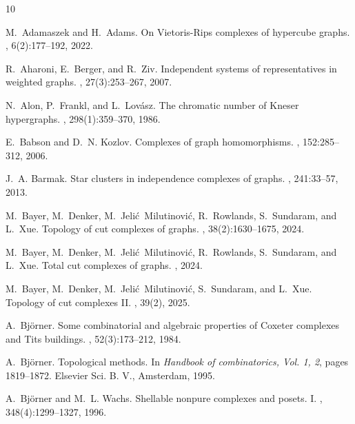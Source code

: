 \documentclass[11pt,reqno,a4paper]{amsart}
\theoremstyle{definition}
\theoremstyle{theorem}
\theoremstyle{remark}
\begin{document}

\begin{thebibliography}{10}
	
	M.~Adamaszek and H.~Adams.
	\newblock On {V}ietoris-{R}ips complexes of hypercube graphs.
	, 6(2):177--192, 2022.
	
	R.~Aharoni, E.~Berger, and R.~Ziv.
	\newblock Independent systems of representatives in weighted graphs.
	, 27(3):253--267, 2007.
	
	N.~Alon, P.~Frankl, and L.~Lov\'asz.
	\newblock The chromatic number of {K}neser hypergraphs.
	, 298(1):359--370, 1986.
	
	E.~Babson and D.~N. Kozlov.
	\newblock Complexes of graph homomorphisms.
	, 152:285--312, 2006.
	
	J.~A. Barmak.
	\newblock Star clusters in independence complexes of graphs.
	, 241:33--57, 2013.
	
	M.~Bayer, M.~Denker, M.~Jeli\'c{}~Milutinovi\'c, R.~Rowlands, S.~Sundaram, and
	L.~Xue.
	\newblock Topology of cut complexes of graphs.
	, 38(2):1630--1675, 2024.
	
	M.~Bayer, M.~Denker, M.~Jeli\'c{}~Milutinovi\'c, R.~Rowlands, S.~Sundaram, and
	L.~Xue.
	\newblock Total cut complexes of graphs.
	, 2024.
	
	M.~Bayer, M.~Denker, M.~Jeli\'c{}~Milutinovi\'c, S.~Sundaram, and L.~Xue.
	\newblock Topology of cut complexes {II}.
	, 39(2), 2025.
	
	A.~Bj\"orner.
	\newblock Some combinatorial and algebraic properties of {C}oxeter complexes
	and {T}its buildings.
	, 52(3):173--212, 1984.
	
	A.~Bj\"orner.
	\newblock Topological methods.
	\newblock In {\em Handbook of combinatorics, {V}ol. 1, 2}, pages 1819--1872.
	Elsevier Sci. B. V., Amsterdam, 1995.
	
	A.~Bj\"orner and M.~L. Wachs.
	\newblock Shellable nonpure complexes and posets. {I}.
	, 348(4):1299--1327, 1996.
	

\end{thebibliography}
\end{document}
